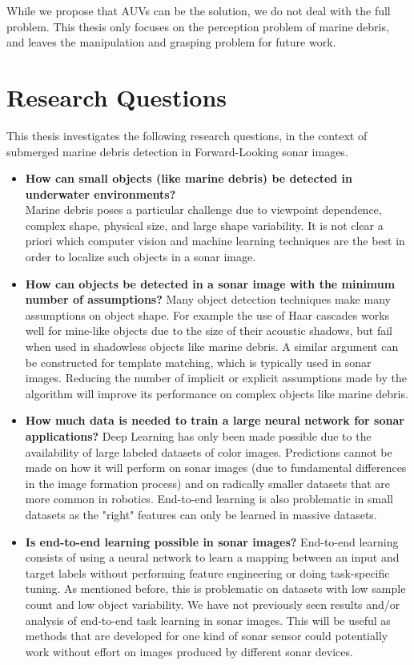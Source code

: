 While we propose that AUVs can be the solution, we do not deal with the full problem. This thesis only focuses on the perception problem of marine debris, and leaves the manipulation and grasping problem for future work.

\section{Research Questions}

This thesis investigates the following research questions, in the context of submerged marine debris detection in Forward-Looking sonar images.

\begin{itemize}
	\item \textbf{How can small objects (like marine debris) be detected in underwater environments?}\\
	Marine debris poses a particular challenge due to viewpoint dependence, complex shape, physical size, and large shape variability. It is not clear a priori which computer vision and machine learning techniques are the best in order to localize such objects in a sonar image.
	
	\item \textbf{How can objects be detected in a sonar image with the minimum number of assumptions?}
	Many object detection techniques make many assumptions on object shape. For example the use of Haar cascades works well for mine-like objects due to the size of their acoustic shadows, but fail when used in shadowless objects like marine debris. A similar argument can be constructed for template matching, which is typically used in sonar images.
	Reducing the number of implicit or explicit assumptions made by the algorithm will improve its performance on complex objects like marine debris.
	
	\item \textbf{How much data is needed to train a large neural network for sonar applications?}
	Deep Learning has only been made possible due to the availability of large labeled datasets of color images. Predictions cannot be made on how it will perform on sonar images (due to fundamental differences in the image formation process) and on radically smaller datasets that are more common in robotics.
	End-to-end learning is also problematic in small datasets as the "right" features can only be learned in massive datasets.
	
	\item \textbf{Is end-to-end learning possible in sonar images?}
	End-to-end learning consists of using a neural network to learn a mapping between an input and target labels without performing feature engineering or doing task-specific tuning. As mentioned before, this is problematic on datasets with low sample count and low object variability. We have not previously seen results and/or analysis of end-to-end task learning in sonar images. This will be useful as methods that are developed for one kind of sonar sensor could potentially work without effort on images produced by different sonar devices.
\end{itemize}


